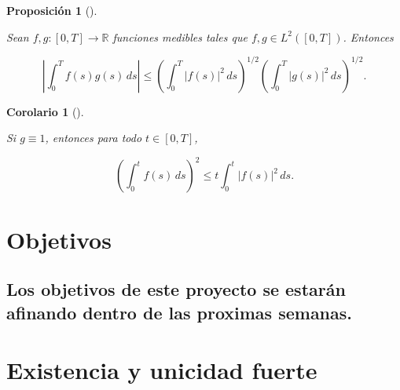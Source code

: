 \documentclass[
  spanish,
  us-letterpaper,
]{scrreprt}
\theoremstyle{plain}
\theoremstyle{plain}
\newtheorem{corollary}{Corolario}[chapter]
\theoremstyle{plain}
\newtheorem{proposition}{Proposición}[chapter]
\theoremstyle{definition}
\theoremstyle{remark}
\begin{document}
\begin{proposition}[]\protect\hypertarget{prp-des_cauchy_schwarz}{}\label{prp-des_cauchy_schwarz}

Sean \(f, g: [0, T] \to \mathbb{R}\) funciones medibles tales que
\(f, g \in L^2([0, T])\). Entonces

\[
\left| \int_0^T f(s) g(s) \, ds \right| \leq \left( \int_0^T |f(s)|^2 \, ds \right)^{1/2} \left( \int_0^T |g(s)|^2 \, ds \right)^{1/2}.
\]

\end{proposition}

\begin{corollary}[]\protect\hypertarget{cor-cauchy_schwarz}{}\label{cor-cauchy_schwarz}

Si \(g \equiv 1\), entonces para todo \(t \in [0, T]\),

\[
\left( \int_0^t f(s) \, ds \right)^2 \leq t \int_0^t |f(s)|^2 \, ds.
\]

\end{corollary}


\chapter{Objetivos}\label{objetivos}

\section{Los objetivos de este proyecto se estarán afinando dentro de
las proximas
semanas.}\label{los-objetivos-de-este-proyecto-se-estaruxe1n-afinando-dentro-de-las-proximas-semanas.}


\chapter{Existencia y unicidad
fuerte}\label{existencia-y-unicidad-fuerte}
\end{document}
